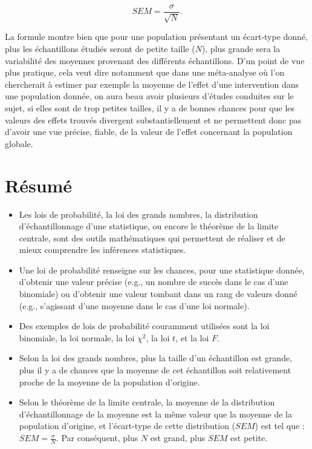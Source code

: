 \documentclass[
]{book}
\providecommand{\tightlist}{%
  \setlength{\itemsep}{0pt}\setlength{\parskip}{0pt}}
\begin{document}
\[SEM = \frac{\sigma}{\sqrt{N}}.\]

La formule montre bien que pour une population présentant un écart-type donné, plus les échantillons étudiés seront de petite taille (\(N\)), plus grande sera la variabilité des moyennes provenant des différents échantillons. D'un point de vue plus pratique, cela veut dire notamment que dans une méta-analyse où l'on chercherait à estimer par exemple la moyenne de l'effet d'une intervention dans une population donnée, on aura beau avoir plusieurs d'études conduites sur le sujet, si elles sont de trop petites tailles, il y a de bonnes chances pour que les valeurs des effets trouvés divergent substantiellement et ne permettent donc pas d'avoir une vue précise, fiable, de la valeur de l'effet concernant la population globale.

\hypertarget{ruxe9sumuxe9-3}{%
\section{Résumé}\label{ruxe9sumuxe9-3}}

\begin{itemize}
\tightlist
\item
  Les lois de probabilité, la loi des grands nombres, la distribution d'échantillonnage d'une statistique, ou encore le théorème de la limite centrale, sont des outils mathématiques qui permettent de réaliser et de mieux comprendre les inférences statistiques.
\item
  Une loi de probabilité renseigne sur les chances, pour une statistique donnée, d'obtenir une valeur précise (e.g., un nombre de succès dans le cas d'une binomiale) ou d'obtenir une valeur tombant dans un rang de valeurs donné (e.g., s'agissant d'une moyenne dans le cas d'une loi normale).
\item
  Des exemples de lois de probabilité couramment utilisées sont la loi binomiale, la loi normale, la loi \(\chi^2\), la loi \(t\), et la loi \(F\).
\item
  Selon la loi des grands nombres, plus la taille d'un échantillon est grande, plus il y a de chances que la moyenne de cet échantillon soit relativement proche de la moyenne de la population d'origine.
\item
  Selon le théorème de la limite centrale, la moyenne de la distribution d'échantillonnage de la moyenne est la même valeur que la moyenne de la population d'origine, et l'écart-type de cette distribution (\(SEM\)) est tel que : \(SEM = \frac{\sigma}{N}.\) Par conséquent, plus \(N\) est grand, plus \(SEM\) est petite.
\end{itemize}
\end{document}
